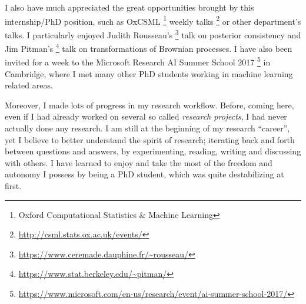 I also have much appreciated the great opportunities brought by this internship/PhD position, such as OxCSML \footnote{Oxford Computational Statistics \& Machine Learning} weekly talks \footnote{\url{http://csml.stats.ox.ac.uk/events/}} or other department's talks. I particularly enjoyed Judith Rousseau's \footnote{\url{https://www.ceremade.dauphine.fr/~rousseau/}} talk on posterior consistency and Jim Pitman's \footnote{\url{https://www.stat.berkeley.edu/~pitman/}} talk on transformations of Brownian processes. I have also been invited for a week to the Microsoft Research AI Summer School 2017 \footnote{\url{https://www.microsoft.com/en-us/research/event/ai-summer-school-2017/}} in Cambridge, where I met many other PhD students working in machine learning related areas.

Moreover, I made lots of progress in my research workflow. Before, coming here, even if I had already worked on several so called \textit{research projects}, I had never actually done any research. I am still at the beginning of my research ``career'', yet I believe to better understand the spirit of research; iterating back and forth between questions and answers, by experimenting, reading, writing and discussing with others.
I have learned to enjoy and take the most of the freedom and autonomy I possess by being a PhD student, which was quite destabilizing at first.

